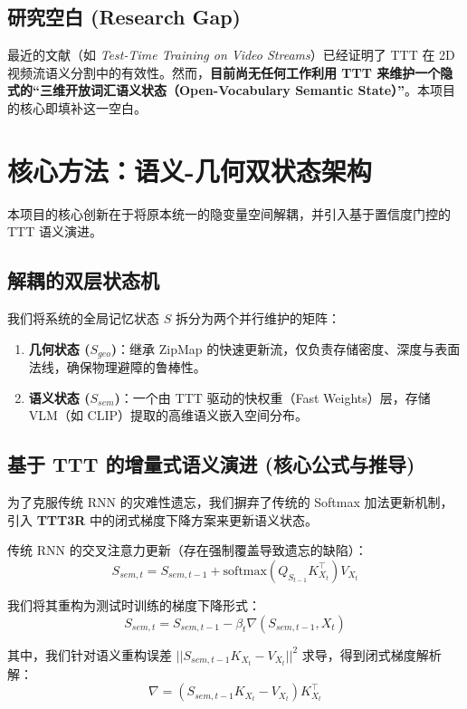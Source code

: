 \documentclass[12pt, a4paper]{article}
\begin{document}
\subsection{研究空白 (Research Gap)}
最近的文献（如 \textit{Test-Time Training on Video Streams}）已经证明了 TTT 在 2D 视频流语义分割中的有效性。然而，\textbf{目前尚无任何工作利用 TTT 来维护一个隐式的“三维开放词汇语义状态（Open-Vocabulary Semantic State）”}。本项目的核心即填补这一空白。

\section{核心方法：语义-几何双状态架构}
本项目的核心创新在于将原本统一的隐变量空间解耦，并引入基于置信度门控的 TTT 语义演进。



\subsection{解耦的双层状态机}
我们将系统的全局记忆状态 $S$ 拆分为两个并行维护的矩阵：
\begin{enumerate}
    \item \textbf{几何状态 ($S_{geo}$)}：继承 ZipMap 的快速更新流，仅负责存储密度、深度与表面法线，确保物理避障的鲁棒性。
    \item \textbf{语义状态 ($S_{sem}$)}：一个由 TTT 驱动的快权重（Fast Weights）层，存储 VLM（如 CLIP）提取的高维语义嵌入空间分布。
\end{enumerate}

\subsection{基于 TTT 的增量式语义演进 (核心公式与推导)}
为了克服传统 RNN 的灾难性遗忘，我们摒弃了传统的 Softmax 加法更新机制，引入 \textbf{TTT3R} 中的闭式梯度下降方案来更新语义状态。

传统 RNN 的交叉注意力更新（存在强制覆盖导致遗忘的缺陷）：
\begin{equation}
    S_{sem, t} = S_{sem, t-1} + \text{softmax}(Q_{S_{t-1}} K_{X_t}^\top) V_{X_t}
\end{equation}

我们将其重构为测试时训练的梯度下降形式：
\begin{equation}
    S_{sem, t} = S_{sem, t-1} - \beta_t \nabla(S_{sem, t-1}, X_t)
\end{equation}

其中，我们针对语义重构误差 $||S_{sem, t-1} K_{X_t} - V_{X_t}||^2$ 求导，得到闭式梯度解析解：
\begin{equation}
    \nabla = (S_{sem, t-1} K_{X_t} - V_{X_t}) K_{X_t}^\top
\end{equation}
\end{document}
